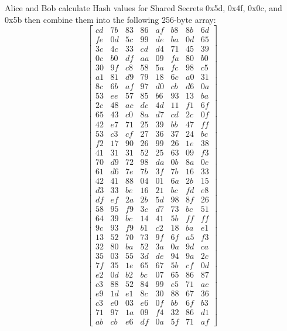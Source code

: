 \documentclass[journal]{IEEEtran}
\begin{document}
Alice and Bob calculate Hash values for Shared Secrets 0x5d, 0x4f, 0x0c, and 0x5b then combine them into the following 256-byte array:
$$
\begin{bmatrix}
cd & 7b & 83 & 86 & af & b8 & 8b & 6d \\
fe & 0d & 5c & 99 & de & ba & 0d & 65 \\
3c & 4c & 33 & cd & d4 & 71 & 45 & 39 \\
0c & b0 & df & aa & 09 & fa & 80 & b0 \\
30 & 9f & c8 & 58 & 5a & fc & 98 & c5 \\
a1 & 81 & d9 & 79 & 18 & 6c & a0 & 31 \\
8c & 6b & af & 97 & d0 & cb & d6 & 0a \\
53 & ee & 57 & 85 & b6 & 93 & 13 & ba \\
2c & 48 & ac & dc & 4d & 11 & f1 & 6f \\
65 & 43 & c0 & 8a & d7 & cd & 2c & 0f \\
42 & e7 & 71 & 25 & 39 & bb & 47 & ff \\
53 & c3 & cf & 27 & 36 & 37 & 24 & bc \\
f2 & 17 & 90 & 26 & 99 & 26 & 1e & 38 \\
41 & 31 & 31 & 52 & 25 & 63 & 09 & f3 \\
70 & d9 & 72 & 98 & da & 0b & 8a & 0e \\
61 & d6 & 7e & 7b & 3f & 7b & 16 & 33 \\
42 & 41 & 88 & 04 & 01 & 6a & 2b & 15 \\
d3 & 33 & be & 16 & 21 & bc & fd & e8 \\
df & ef & 2a & 2b & 5d & 98 & 8f & 26 \\
58 & 95 & f9 & 3c & d7 & 73 & bc & 51 \\
64 & 39 & bc & 14 & 41 & 5b & ff & ff \\
9c & 93 & f9 & b1 & c2 & 18 & ba & e1 \\
13 & 52 & 70 & 73 & 9f & 6f & a5 & f3 \\
32 & 80 & ba & 52 & 3a & 0a & 9d & ca \\
35 & 03 & 55 & 3d & de & 94 & 9a & 2c \\
7f & 35 & 1e & 65 & 67 & 5b & cf & 0d \\
e2 & 0d & b2 & bc & 07 & 65 & 86 & 87 \\
c3 & 88 & 52 & 84 & 99 & e5 & 71 & ac \\
e9 & 1d & e1 & 8c & 30 & 88 & 67 & 36 \\
c3 & e0 & 03 & e6 & 0f & bb & 6f & b3 \\
71 & 97 & 1a & 09 & f4 & 32 & 86 & d1 \\
ab & cb & e6 & df & 0a & 5f & 71 & af
\end{bmatrix}
$$
\end{document}
